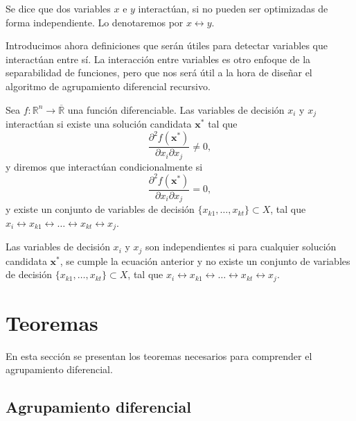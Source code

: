 \begin{definicion}
\label{D4}
Se dice que dos variables \( x \) e \( y \) interactúan, si no pueden ser optimizadas de forma independiente. Lo denotaremos por \( x \leftrightarrow y \).
\end{definicion}

Introducimos ahora definiciones que serán útiles para detectar variables que interactúan entre sí. La interacción entre variables es otro enfoque de la separabilidad de funciones, pero que nos será útil a la hora de diseñar el algoritmo de agrupamiento diferencial recursivo.

\begin{definicion}
\label{D5}
Sea \( f : \mathbb{R}^n \to \overline{\mathbb{R}} \) una función diferenciable. Las variables de decisión \( x_i \) y \( x_j \) interactúan si existe una solución candidata \( \mathbf{x}^* \) tal que
\begin{equation}
\frac{\partial^2 f(\mathbf{x}^*)}{\partial x_i \partial x_j} \neq 0,
\label{EQ4}
\end{equation}
y diremos que interactúan condicionalmente si 
\begin{equation}
\frac{\partial^2 f(\mathbf{x}^*)}{\partial x_i \partial x_j} = 0,
\label{EQ5}
\end{equation}
y existe un conjunto de variables de decisión \(\{x_{k1}, \ldots, x_{kt}\} \subset X\), tal que \( x_i \leftrightarrow x_{k1} \leftrightarrow \ldots \leftrightarrow x_{kt} \leftrightarrow x_j \). 

Las variables de decisión \( x_i \) y \( x_j \) son independientes si para cualquier solución candidata \( \mathbf{x}^* \), se cumple la ecuación anterior y no existe un conjunto de variables de decisión \(\{x_{k1}, \ldots, x_{kt}\} \subset X\), tal que \( x_i \leftrightarrow x_{k1} \leftrightarrow \ldots \leftrightarrow x_{kt} \leftrightarrow x_j \).
\end{definicion}

\section{Teoremas}

En esta sección se presentan los teoremas necesarios para comprender el agrupamiento diferencial.

\subsection{Agrupamiento diferencial}

